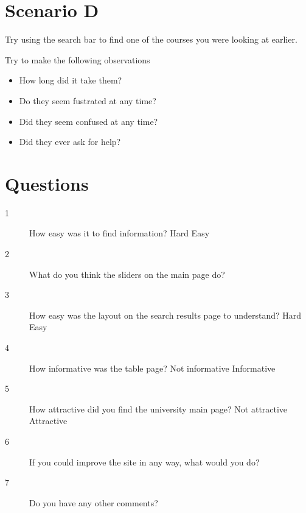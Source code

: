 \documentclass[11pt]{article} %
\begin{document}
\section{Scenario D}
Try using the search bar to find one of the courses you were looking at earlier.

Try to make the following observations
\begin{itemize}
    \item How long did it take them?
    \item Do they seem fustrated at any time?
    \item Did they seem confused at any time?
    \item Did they ever ask for help?
\end{itemize}
\newpage

\section{Questions}\label{sec:quest}
\begin{description}
    \item[1] How easy was it to find information? \newline\newline
    Hard \quad{}\quad\quad{}\quad\quad{} \quad\quad{} \quad\quad{} \quad\quad{}\quad\quad Easy
    \newline
    \item[2] What do you think the sliders on the main page do? \newline\newline\newline
    \item[3] How easy was the layout on the search results page to understand? \newline\newline
Hard \quad{}\quad\quad{}\quad\quad{} \quad\quad{} \quad\quad{} \quad\quad{}\quad\quad Easy\newline
    \item[4] How informative was the table page? \newline \newline  
Not informative \quad{}\quad\quad{}\quad\quad{} \quad\quad{} \quad\quad{} \quad\quad{}\quad\quad Informative\newline
    \item[5] How attractive did you find the university main page? \newline\newline Not attractive \quad{}\quad\quad{}\quad\quad{} \quad\quad{} \quad\quad{} \quad\quad{}\quad\quad Attractive\newline
    \item[6] If you could improve the site in any way, what would you do? \newline\newline\newline
    \item[7] Do you have any other comments?

\end{description}
\end{document}
